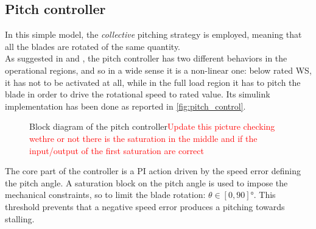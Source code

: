 \subsection{Pitch controller}
In this simple model, the \textit{collective} pitching strategy is employed, meaning that all the blades are rotated of the same quantity.\\
As suggested in \cite{Aerodynamics_of_wind_turbines} and \cite{SMILDEN2016386}, the pitch controller has two different behaviors in the operational regions, and so in a wide sense it is a non-linear one: below rated \acrshort{WS}, it has not to be activated at all, while in the full load region it has to pitch the blade in order to drive the rotational speed to rated value. Its simulink implementation has been done as reported in \autoref{fig:pitch_control}.
\begin{figure}[htb]
    \centering
    
    \caption{Block diagram of the pitch controller\textcolor{red}{Update this picture checking wethre or  not there is the saturation in the middle and if the input/output of the first saturation are correct}}
    \label{fig:pitch_control}
\end{figure}

The core part of the controller is a \acrfull{PI} action driven by the speed error defining the pitch angle. A saturation block on the pitch angle is used to impose the mechanical constraints, so to limit the blade rotation: $\theta \in \left[0, 90\right] \si{\degree}$. This threshold prevents that a negative speed error produces a pitching towards stalling.

